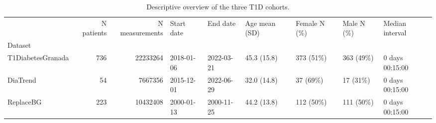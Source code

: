 \begin{table}
\caption{Descriptive overview of the three T1D cohorts.}
\label{tab:cohort_overview}
\begin{tabular}{lrrllllll}
\toprule
 & N patients & N measurements & Start date & End date & Age mean (SD) & Female N (\%) & Male N (\%) & Median interval \\
Dataset &  &  &  &  &  &  &  &  \\
\midrule
T1DiabetesGranada & 736 & 22233264 & 2018-01-06 & 2022-03-21 & 45.3 (15.8) & 373 (51\%) & 363 (49\%) & 0 days 00:15:00 \\
DiaTrend & 54 & 7667356 & 2015-12-01 & 2022-06-29 & 32.0 (14.8) & 37 (69\%) & 17 (31\%) & 0 days 00:15:00 \\
ReplaceBG & 223 & 10432408 & 2000-01-13 & 2000-11-25 & 44.2 (13.8) & 112 (50\%) & 111 (50\%) & 0 days 00:15:00 \\
\bottomrule
\end{tabular}
\end{table}
